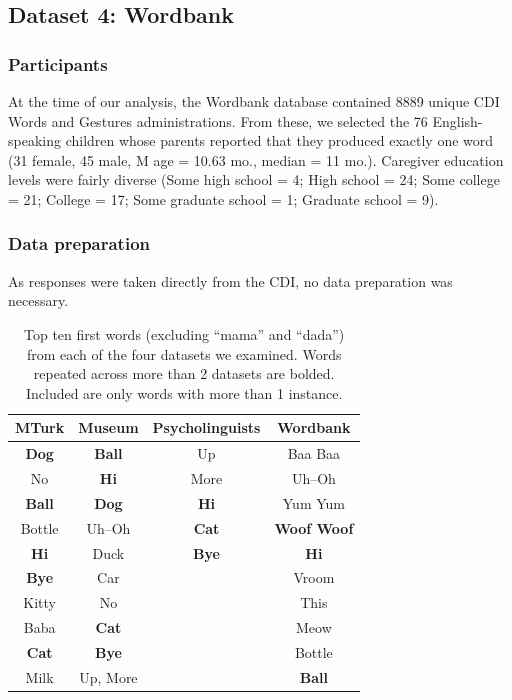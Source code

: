 \documentclass[10pt,letterpaper]{article}
\begin{document}
\subsection{Dataset 4: Wordbank}

\subsubsection{Participants}

At the time of our analysis, the Wordbank database contained 8889 unique CDI Words and Gestures administrations. From these, we selected the 76 English-speaking children whose parents reported that they produced exactly one word (31 female, 45 male, M age = 10.63 mo., median = 11 mo.). Caregiver education levels were fairly diverse (Some high school = 4; High school = 24; Some college = 21; College = 17; Some graduate school = 1; Graduate school = 9). 

\subsubsection{Data preparation}

As responses were taken directly from the CDI, no data preparation was necessary.


\begin{table}[tb]
\centering
\begin{tabular}{cccc}
\hline
{\bf MTurk} & {\bf Museum} & {\bf Psycholinguists} & {\bf Wordbank} \\ 
\hline
\textbf{Dog} & \textbf{Ball} & Up & Baa Baa \\ 
No & \textbf{Hi} & More & Uh--Oh \\
\textbf{Ball} & \textbf{Dog}& \textbf{Hi} & Yum Yum \\ 
Bottle & Uh--Oh& \textbf{Cat} & \textbf{Woof Woof} \\ 
\textbf{Hi} & Duck & \textbf{Bye} & \textbf{Hi} \\
\textbf{Bye} & Car &  & Vroom \\
Kitty & No &  & This \\
Baba & \textbf{Cat} &  & Meow \\
\textbf{Cat} & \textbf{Bye}&  & Bottle \\
Milk & Up, More &  & \textbf{Ball} \\
\hline 
\end{tabular}
\caption {\small \label{tab:top10} Top ten first words (excluding ``mama'' and ``dada'') from each of the four datasets we examined. Words repeated across more than 2 datasets are bolded. Included are only words with more than 1 instance.}
\vspace{-2.6em}
\end{table}
\end{document}

